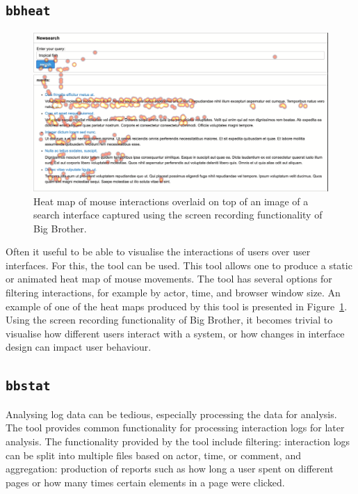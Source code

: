 \vspace{-8pt}
\subsection{\texttt{bbheat}}

\begin{figure}
	\includegraphics[width=\linewidth]{heatmap}
	\caption{Heat map of mouse interactions overlaid on top of an image of a search interface captured using the screen recording functionality of Big Brother.\vspace{-16pt}}
	\label{fig:heat}
\end{figure}

Often it useful to be able to visualise the interactions of users over user interfaces. For this, the \bbheat tool can be used. This tool allows one to produce a static or animated heat map of mouse movements. The tool has several options for filtering interactions, for example by actor, time, and browser window size. An example of one of the heat maps produced by this tool is presented in Figure~\ref{fig:heat}. Using the screen recording functionality of Big Brother, it becomes trivial to visualise how different users interact with a system, or how changes in interface design can impact user behaviour.

\vspace{-8pt}
\subsection{\texttt{bbstat}}

Analysing log data can be tedious, especially processing the data for analysis. The \bbstat tool provides common functionality for processing interaction logs for later analysis. The functionality provided by the \bbstat tool include filtering: interaction logs can be split into multiple files based on actor, time, or comment, and aggregation: production of reports such as how long a user spent on different pages or how many times certain elements in a page were clicked.


